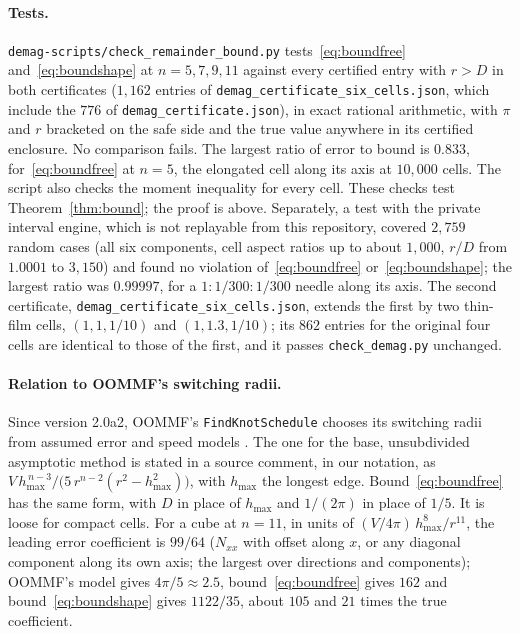 \documentclass[11pt]{amsart}
\theoremstyle{plain}
\theoremstyle{definition}
\theoremstyle{remark}
\begin{document}
\paragraph{Tests.}
\texttt{demag-scripts/check\_remainder\_bound.py} tests~\eqref{eq:boundfree}
and~\eqref{eq:boundshape} at $n=5,7,9,11$ against every certified entry with
$r>D$ in both certificates ($1{,}162$ entries of
\texttt{demag\_certificate\_six\_cells.json}, which include the $776$ of
\texttt{demag\_certificate.json}), in exact rational
arithmetic, with $\pi$ and $r$ bracketed on the safe side and the true value
anywhere in its certified enclosure. No comparison fails. The largest ratio of
error to bound is $0.833$, for~\eqref{eq:boundfree} at $n=5$, the elongated cell
along its axis at $10{,}000$ cells. The script also checks the moment inequality
for every cell. These checks test Theorem~\ref{thm:bound}; the proof is above.
Separately, a test with the private interval engine, which is not
replayable from this repository, covered $2{,}759$ random cases (all six
components, cell aspect ratios up to about $1{,}000$, $r/D$ from $1.0001$ to
$3{,}150$) and found no violation of~\eqref{eq:boundfree}
or~\eqref{eq:boundshape}; the largest ratio was $0.99997$, for a
$1:1/300:1/300$ needle along its axis. The second certificate,
\texttt{demag\_certificate\_six\_cells.json}, extends the first by two thin-film
cells, $(1,1,1/10)$ and $(1,1.3,1/10)$; its $862$ entries for the original four
cells are identical to those of the first, and it passes
\texttt{check\_demag.py} unchanged.

\paragraph{Relation to OOMMF's switching radii.}
Since version 2.0a2, OOMMF's \texttt{FindKnotSchedule} chooses its switching
radii from assumed error and speed models \cite{OOMMF,DP2019}. The one for the base,
unsubdivided asymptotic method is stated in a source comment, in our notation, as
$V\,h_{\max}^{\,n-3}/\big(5\,r^{n-2}(r^2-h_{\max}^2)\big)$, with $h_{\max}$ the
longest edge. Bound~\eqref{eq:boundfree} has the same form, with $D$ in place of
$h_{\max}$ and $1/(2\pi)$ in place of $1/5$. It is loose for compact cells. For a
cube at $n=11$, in units of $(V/4\pi)\,h_{\max}^{8}/r^{11}$, the leading error
coefficient is $99/64$ ($N_{xx}$ with offset along $x$, or any diagonal component
along its own axis; the largest over directions and components); OOMMF's model gives $4\pi/5\approx2.5$, bound~\eqref{eq:boundfree}
gives $162$ and bound~\eqref{eq:boundshape} gives $1122/35$, about $105$ and $21$
times the true coefficient.
\end{document}
